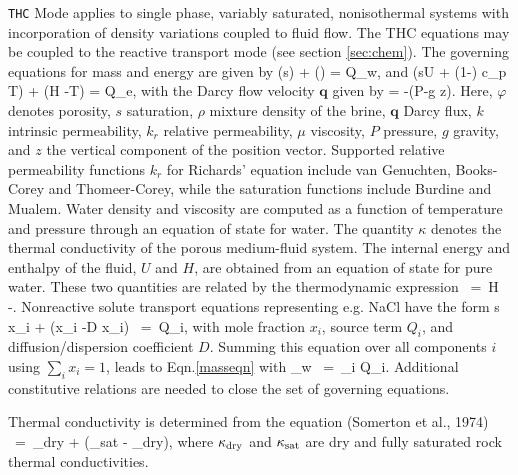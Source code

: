 \documentclass[12pt]{article}
\def\EQ#1\EN{\begin{equation}#1\end{equation}}
\newcommand{\eq}{\ =\ }
\newcommand{\p}{{\partial}}
\newcommand{\bnabla}{\boldsymbol{\nabla}}
\newcommand{\bq}{\boldsymbol{q}}
\begin{document}
{\tt THC} Mode applies to single phase, variably saturated, nonisothermal systems
with incorporation of density variations coupled to fluid flow. The THC equations may be coupled to the reactive transport mode (see section \ref{sec:chem}).
The governing equations for mass and energy are given by
\EQ\label{masseqn}
\frac{\p}{\p t}\left(\varphi s\rho\right) + \bnabla\cdot\left(\rho\bq\right) = Q_w,
\EN
and
\EQ
\frac{\p}{\p t}\left(\varphi s\rho U + (1-\varphi) c_p T\right) + \bnabla\cdot\left(\rho\bq H -\kappa \bnabla T\right) = Q_e,
\EN
with the Darcy flow velocity $\bq$ given by
\EQ
\bq = -\bnabla\left(P-\rho g z\right).
\EN
Here, $\varphi$ denotes porosity, $s$ saturation, $\rho$ mixture density of the brine, $\bq$ Darcy flux, $k$ intrinsic permeability, $k_r$ relative permeability, $\mu$ viscosity, $P$ pressure, $g$ gravity, and $z$ the vertical component of the position vector.  Supported relative permeability functions $k_r$ for Richards' equation include van Genuchten, Books-Corey and Thomeer-Corey, while the saturation functions include Burdine and Mualem.  Water density and viscosity are computed as a function of temperature and pressure through an equation of state for water. The quantity $\kappa$ denotes the thermal conductivity of the porous medium-fluid system. The internal energy and enthalpy of the fluid, $U$ and $H$, are obtained from an equation of state for pure water. These two quantities are related by the thermodynamic expression
\EQ
U \eq H -.
\EN
Nonreactive solute transport equations representing e.g. NaCl have the form
\EQ
\frac{\p}{\p t} \varphi s \rho x_i + \bnabla\cdot\Big(\bq \rho x_i -\varphi D \rho\bnabla x_i\Big) \eq Q_i,
\EN
with mole fraction $x_i$, source term $Q_i$, and diffusion/dispersion coefficient $D$. Summing this equation over all components $i$ using $\sum_ix_i=1$, leads to Eqn.\eqref{masseqn} with
\EQ
Q_w \eq \sum_i Q_i.
\EN
Additional constitutive relations are needed to close the set of governing equations.
 
 
Thermal conductivity is determined from the equation (Somerton et al., 1974)  
\EQ\label{cond1} 
\kappa \eq \kappa_{\rm dry} +  (\kappa_{\rm sat} - \kappa_{\rm dry}), 
\EN 
where $\kappa_{\rm dry}$ and $\kappa_{\rm sat}$ are dry and fully saturated rock thermal conductivities. 
\end{document}
